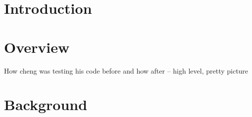 \documentclass{sig-alternate}
\newcommand{\psharp}{P\#\xspace}
\newcommand{\csharp}{C\#\xspace}
\begin{document}
\maketitle
\begin{abstract}
Testing distributed systems is very challenging due to many sources of nondeterminism, such as races in the asynchronous communication between components of a system, and unexpected failures. Stress testing techniques, commonly used in industry today, are unable to capture and control all these sources of nondeterminism, which results in many bugs being missed during testing and only getting exposed in production.

We present a new methodology for systematically testing unmodified distributed systems. Our approach involves the use of \psharp, an extension of \csharp that combines a flexible environmental modeling approach with a concurrency testing framework, which can capture and systematically explore all sources of nondeterminism. We present two case studies of using \psharp to test production distributed systems inside Microsoft. Using \psharp, we managed to uncover a very subtle bug that was haunting developers for a long time, as they did not have an effective way to reproduce it. \psharp uncovered the bug in a very small setting, which made it easy to examine traces, identify and fix the problem.

\end{abstract}



\section{Introduction}
\label{sec:intro}



\section{Overview}
\label{sec:overview}

How cheng was testing his code before and how after -- high level, pretty picture

%

\section{Background}
\label{sec:bg}
\end{document}
